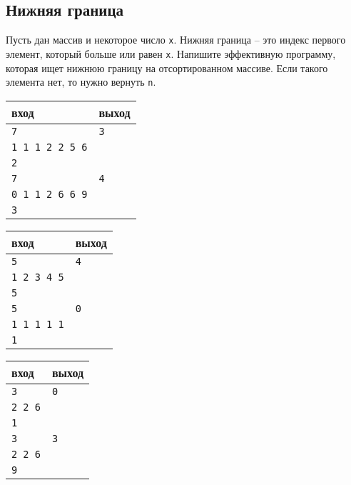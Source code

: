 \documentclass{article}
\begin{document}
\subsection{Нижняя граница}
Пусть дан массив и некоторое число \texttt{x}. Нижняя граница -- это индекс первого элемент, который больше или равен \texttt{x}. Напишите эффективную программу, которая ищет нижнюю границу на отсортированном массиве. Если такого элемента нет, то нужно вернуть \texttt{n}.

\begin{multicols}{3}
\begin{center}
\begin{tabular}{ l | l }
 вход & выход \\ \hline
 \texttt{7} & \texttt{3}  \\  
 \texttt{1 1 1 2 2 5 6} & \\
 \texttt{2} & \\ \hline
 \texttt{7} & \texttt{4}  \\  
 \texttt{0 1 1 2 6 6 9} & \\
 \texttt{3} & \\ 
\end{tabular}
\end{center}

\begin{center}
\begin{tabular}{ l | l }
 вход & выход \\ \hline
 \texttt{5} & \texttt{4}  \\  
 \texttt{1 2 3 4 5} & \\
 \texttt{5} & \\ \hline
 \texttt{5} & \texttt{0}  \\  
 \texttt{1 1 1 1 1} & \\
 \texttt{1} & \\
\end{tabular}
\end{center}

\begin{center}
\begin{tabular}{ l | l }
 вход & выход \\ \hline
 \texttt{3} & \texttt{0}  \\  
 \texttt{2 2 6} & \\
 \texttt{1} & \\ \hline
 \texttt{3} & \texttt{3}  \\  
 \texttt{2 2 6} & \\
 \texttt{9} & \\
\end{tabular}
\end{center}
\end{multicols}
\end{document}
